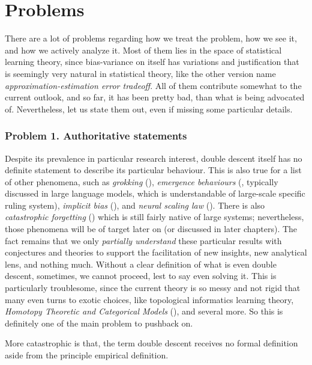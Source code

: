 \documentclass[
  journal=largetwo,
  year=2025,
  volume=37,
]{cup-journal}
\begin{document}
\section{Problems}
There are a lot of problems regarding how we treat the problem, how we see it, and how we actively analyze it. Most of them lies in the space of statistical learning theory, since bias-variance on itself has variations and justification that is seemingly very natural in statistical theory, like the other version name \textit{approximation-estimation error tradeoff}. All of them contribute somewhat to the current outlook, and so far, it has been pretty bad, than what is being advocated of. Nevertheless, let us state them out, even if missing some particular details. 

\subsubsection*{Problem 1. Authoritative statements}
Despite its prevalence in particular research interest, double descent itself has no definite statement to describe its particular behaviour. This is also true for a list of other phenomena, such as \textit{grokking} (\cite{power2022grokkinggeneralizationoverfittingsmall}), \textit{emergence behaviours} (\cite{wei2022emergentabilitieslargelanguage}, typically discussed in large language models, which is understandable of large-scale specific ruling system), \textit{implicit bias} (\cite{soudry2024implicitbiasgradientdescent}), and \textit{neural scaling law} (\cite{kaplan2020scalinglawsneurallanguage,wei2022emergentabilitieslargelanguage}). There is also \textit{catastrophic forgetting} (\cite{vandeven2024continuallearningcatastrophicforgetting}) which is still fairly native of large systems; nevertheless, those phenomena will be of target later on (or discussed in later chapters). The fact remains that we only \textit{partially understand} these particular results with conjectures and theories to support the facilitation of new insights, new analytical lens, and nothing much. Without a clear definition of what is even double descent, sometimes, we cannot proceed, lest to say even solving it. This is particularly troublesome, since the current theory is so messy and not rigid that many even turns to exotic choices, like topological informatics learning theory, \textit{Homotopy Theoretic and Categorical Models} (\cite{Manin_2024}), and several more. So this is definitely one of the main problem to pushback on. 

More catastrophic is that, the term double descent receives no formal definition aside from the principle empirical definition. 
\end{document}
